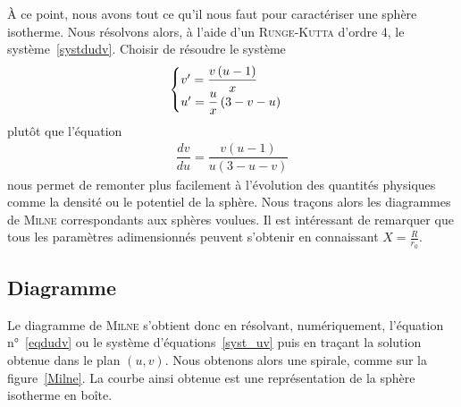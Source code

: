	À ce point, nous avons tout ce qu'il nous faut pour caractériser une sphère isotherme. Nous résolvons alors, à l'aide d'un \textsc{Runge-Kutta} d'ordre 4, le
	système~\ref{systdudv}. Choisir de résoudre le système
	\begin{align}
		\begin{cases}
			v' = \dfrac{v \left( u - 1\right)}{x} \\
			u' = \dfrac{u}{x}\left(3 - v - u\right)
		\end{cases} \notag
	\end{align}
	plutôt que l'équation
	\begin{align*}
		\dfrac{d v}{d u} = \dfrac{v \left( u - 1\right)}{u \left(3 - u - v\right)}
	\end{align*}
	nous permet de remonter plus facilement à l'évolution des quantités physiques comme la densité ou le potentiel de la sphère.
	Nous traçons alors les diagrammes de \textsc{Milne} correspondants aux sphères voulues. Il est intéressant de remarquer
	que tous les paramètres adimensionnés peuvent s'obtenir en connaissant $X = \frac{R}{r_0}$.

\subsection{Diagramme}
	Le diagramme de \textsc{Milne} s'obtient donc en résolvant, numériquement,
	l'équation n°~\ref{eqdudv} ou le système d'équations~\ref{syst_uv} puis en traçant la solution obtenue dans le plan $\left(u,v\right)$.
	Nous obtenons alors une spirale, comme sur la figure~\ref{Milne}.
	La courbe ainsi obtenue est une représentation de la sphère isotherme en boîte.

